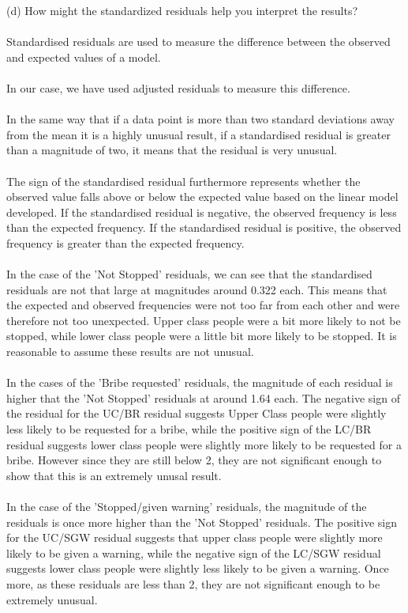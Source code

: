 \documentclass[12pt,letterpaper]{article}
\begin{document}
\newpage
 (d) How might the standardized residuals help you interpret the results? 
\\\\
Standardised residuals are used to measure the difference between the observed and expected values of a model. 
\\\\
In our case, we have used adjusted residuals to measure this difference.
\\\\
In the same way that if a data point is more than two standard deviations away from the mean it is a highly unusual result, if a standardised residual is greater than a magnitude of two, it means that the residual is very unusual.
\\\\
The sign of the standardised residual furthermore represents whether the observed value falls above or below the expected value based on the linear model developed. If the standardised residual is negative, the observed frequency is less than the expected frequency. If the standardised residual is positive, the observed frequency is greater than the expected frequency. 
\\\\
In the case of the 'Not Stopped' residuals, we can see that the standardised residuals are not that large at magnitudes around 0.322 each. This means that the expected and observed frequencies were not too far from each other and were therefore not too unexpected. Upper class people were a  bit more likely to not be stopped, while lower class people were a little bit more likely to be stopped. It is reasonable to assume these results are not unusual.
\\\\
In the cases of the 'Bribe requested' residuals, the magnitude of each residual is higher that the 'Not Stopped' residuals at around 1.64 each. The negative sign of the residual for the UC/BR residual suggests Upper Class people were slightly less likely to be requested for a bribe, while the positive sign of the LC/BR residual suggests lower class people were slightly more likely to be requested for a bribe. However since they are still below 2, they are not significant enough to show that this is an extremely unusal result.
\\\\
In the case of the 'Stopped/given warning' residuals, the magnitude of the residuals is once more higher than the 'Not Stopped' residuals. The positive sign for the UC/SGW residual suggests that upper class people were slightly more likely to be given a warning, while the negative sign of the LC/SGW residual suggests lower class people were slightly less likely to be given a warning. Once more, as these residuals are less than 2, they are not significant enough to be extremely unusual. 
\end{document}
